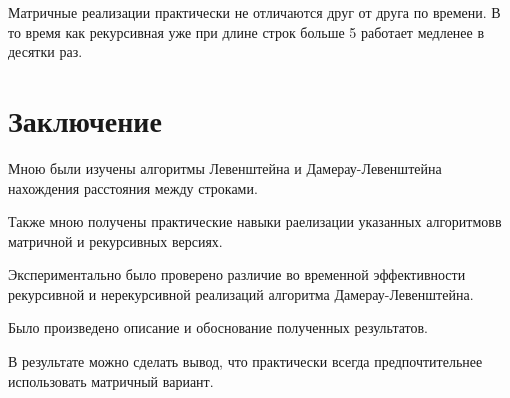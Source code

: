 \documentclass[12pt]{report}
\begin{document}
\par
Матричные реализации практически не отличаются друг от друга по времени. В то время как рекурсивная уже при длине строк больше 5 работает медленее в десятки раз.

\chapter*{Заключение}

Мною были изучены алгоритмы Левенштейна и Дамерау-Левенштейна нахождения расстояния между строками.

Также мною получены практические навыки раелизации указанных алгоритмовв матричной  и рекурсивных версиях. 

Экспериментально было проверено различие во временной эффективности рекурсивной и нерекурсивной реализаций алгоритма Дамерау-Левенштейна.

Было произведено описание и обоснование полученных результатов.

В результате можно сделать вывод, что практически всегда предпочтительнее использовать матричный вариант.
\end{document}
